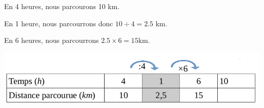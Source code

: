 \documentclass[xcolor={dvipsnames}]{beamer}
\begin{document}
\begin{frame}
	En 4 heures, nous parcourons 10 km. \pause
	
	En 1 heure, nous parcourrons donc $10 \div 4 = \num{2.5}$ km. \pause
	
	En 6 heures, nous parcourrons $\num{2.5} \times 6 = 15 $km. \pause
	
	
	\begin{center}
		\includegraphics[scale=0.5]{tab3_2}
	\end{center}

\end{frame}
\end{document}
